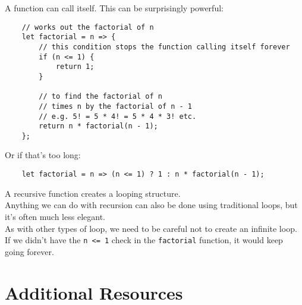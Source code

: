 
A function can call itself. This can be surprisingly powerful:

\begin{verbatim}
    // works out the factorial of n
    let factorial = n => {
        // this condition stops the function calling itself forever
        if (n <= 1) {
            return 1;
        }

        // to find the factorial of n
        // times n by the factorial of n - 1
        // e.g. 5! = 5 * 4! = 5 * 4 * 3! etc.
        return n * factorial(n - 1);
    };
\end{verbatim}

Or if that's too long:

\begin{verbatim}
    let factorial = n => (n <= 1) ? 1 : n * factorial(n - 1);
\end{verbatim}

A recursive function creates a looping structure.
\\

Anything we can do with recursion can also be done using traditional loops, but it's often much less elegant.
\\

As with other types of loop, we need to be careful not to create an infinite loop. If we didn't have the \texttt{n <= 1} check in the \texttt{factorial} function, it would keep going forever.

\pagebreak

\section{Additional Resources}

